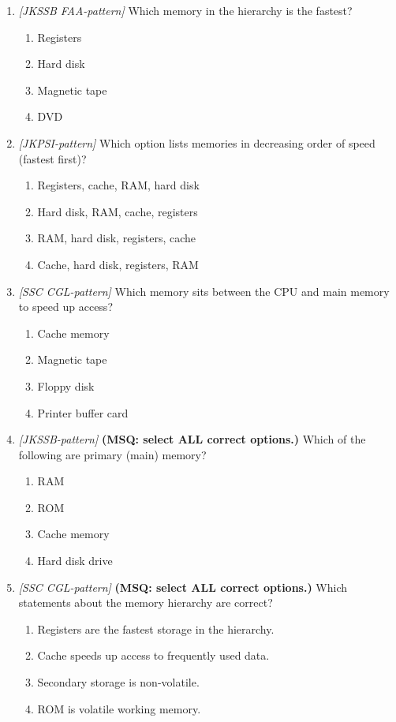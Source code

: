 \documentclass[11pt]{article}
\begin{document}
\begin{enumerate}[label=\textbf{Q\arabic*.}, leftmargin=*]
\item \textit{[JKSSB FAA-pattern]} Which memory in the hierarchy is the fastest?
  \begin{enumerate}[label=\Alph*.]
    \item Registers
    \item Hard disk
    \item Magnetic tape
    \item DVD
  \end{enumerate}
\item \textit{[JKPSI-pattern]} Which option lists memories in decreasing order of speed (fastest first)?
  \begin{enumerate}[label=\Alph*.]
    \item Registers, cache, RAM, hard disk
    \item Hard disk, RAM, cache, registers
    \item RAM, hard disk, registers, cache
    \item Cache, hard disk, registers, RAM
  \end{enumerate}
\item \textit{[SSC CGL-pattern]} Which memory sits between the CPU and main memory to speed up access?
  \begin{enumerate}[label=\Alph*.]
    \item Cache memory
    \item Magnetic tape
    \item Floppy disk
    \item Printer buffer card
  \end{enumerate}
\item \textit{[JKSSB-pattern]} \textbf{(MSQ: select ALL correct options.)} Which of the following are primary (main) memory?
  \begin{enumerate}[label=\Alph*.]
    \item RAM
    \item ROM
    \item Cache memory
    \item Hard disk drive
  \end{enumerate}
\item \textit{[SSC CGL-pattern]} \textbf{(MSQ: select ALL correct options.)} Which statements about the memory hierarchy are correct?
  \begin{enumerate}[label=\Alph*.]
    \item Registers are the fastest storage in the hierarchy.
    \item Cache speeds up access to frequently used data.
    \item Secondary storage is non-volatile.
    \item ROM is volatile working memory.
  \end{enumerate}
\end{enumerate}
\def\JKSSBLessonID{7}\def\JKSSBAnswers{0}
\end{document}
